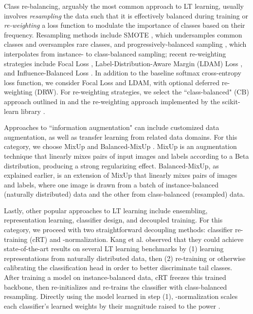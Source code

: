 \documentclass[runningheads]{llncs}
\begin{document}
Class re-balancing, arguably the most common approach to LT learning, usually involves \textit{resampling} the data such that it is effectively balanced during training or \textit{re-weighting} a loss function to modulate the importance of classes based on their frequency. Resampling methods include SMOTE \cite{chawla2002smote}, which undersamples common classes and oversamples rare classes, and progressively-balanced sampling \cite{kangdecoupling2020}, which interpolates from instance- to class-balanced sampling; recent re-weighting strategies include Focal Loss \cite{linfocal2017}, Label-Distribution-Aware Margin (LDAM) Loss \cite{caolearning2019}, and Influence-Balanced Loss \cite{park2021influence}. In addition to the baseline softmax cross-entropy loss function, we consider Focal Loss and LDAM, with optional deferred re-weighting (DRW). For re-weighting strategies, we select the ``class-balanced" (CB) approach outlined in \cite{cuiclass2019} and the re-weighting approach implemented by the scikit-learn library \cite{scikit-learn}.

Approaches to ``information augmentation" can include customized data augmentation, as well as transfer learning from related data domains. For this category, we choose MixUp \cite{zhang2018mixup} and Balanced-MixUp \cite{galdranbalanced2021}. MixUp is an augmentation technique that linearly mixes pairs of input images and labels according to a Beta distribution, producing a strong regularizing effect. Balanced-MixUp, as explained earlier, is an extension of MixUp that linearly mixes pairs of images and labels, where one image is drawn from a batch of instance-balanced (naturally distributed) data and the other from class-balanced (resampled) data.

Lastly, other popular approaches to LT learning include ensembling, representation learning, classifier design, and decoupled training. For this category, we proceed with two straightforward decoupling methods: classifier re-training (cRT) and -normalization. Kang et al. \cite{kangdecoupling2020} observed that they could achieve state-of-the-art results on several LT learning benchmarks by (1) learning representations from naturally distributed data, then (2) re-training or otherwise calibrating the classification head in order to better discriminate tail classes. After training a model on instance-balanced data, cRT freezes this trained backbone, then re-initializes and re-trains the classifier with class-balanced resampling. Directly using the model learned in step (1), -normalization scales each classifier's learned weights by their magnitude raised to the power .
\end{document}
